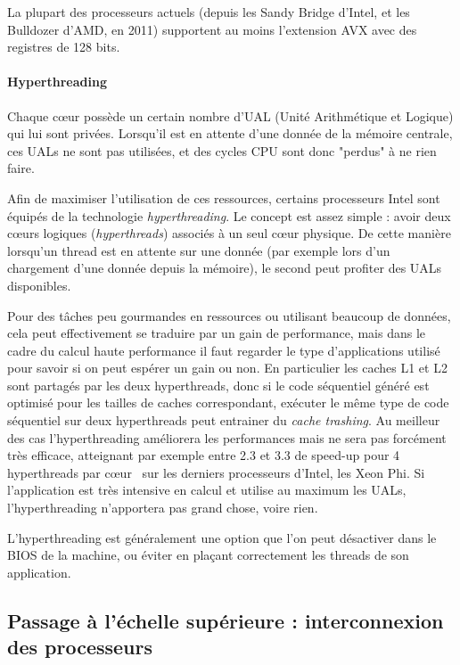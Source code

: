 La plupart des processeurs actuels (depuis les Sandy Bridge d'Intel, et les Bulldozer d'AMD, en 2011) supportent au moins l'extension AVX avec des registres de 128 bits.

\paragraph{Hyperthreading}

Chaque cœur possède un certain nombre d'UAL (Unité Arithmétique et Logique) qui lui sont privées. Lorsqu'il est en attente d'une donnée de la mémoire centrale, ces UALs ne sont pas utilisées, et des cycles CPU sont donc "perdus" à ne rien faire.

Afin de maximiser l'utilisation de ces ressources, certains processeurs Intel sont équipés de la technologie \emph{hyperthreading}.
Le concept est assez simple : avoir deux cœurs logiques (\emph{hyperthreads}) associés à un seul cœur physique.
De cette manière lorsqu'un thread est en attente sur une donnée (par exemple lors d'un chargement d'une donnée depuis la mémoire), le second peut profiter des UALs disponibles.

Pour des tâches peu gourmandes en ressources ou utilisant beaucoup de données, cela peut effectivement se traduire par un gain de performance, mais dans le cadre du calcul haute performance il faut regarder le type d'applications utilisé pour savoir si on peut espérer un gain ou non.
En particulier les caches L1 et L2 sont partagés par les deux hyperthreads, donc si le code séquentiel généré est optimisé pour les tailles de caches correspondant, exécuter le même type de code séquentiel sur deux hyperthreads peut entrainer du \emph{cache trashing}.
Au meilleur des cas l'hyperthreading améliorera les performances mais ne sera pas forcément très efficace, atteignant par exemple entre 2.3 et 3.3 de speed-up pour 4 hyperthreads par cœur~\cite{Jeffers2016} sur les derniers processeurs d'Intel, les Xeon Phi.
Si l'application est très intensive en calcul et utilise au maximum les UALs, l'hyperthreading n'apportera pas grand chose, voire rien.

L'hyperthreading est généralement une option que l'on peut désactiver dans le BIOS de la machine, ou éviter en plaçant correctement les threads de son application.


\subsection{Passage à l'échelle supérieure : interconnexion des processeurs}\label{sec:context:numa:interconnect}

